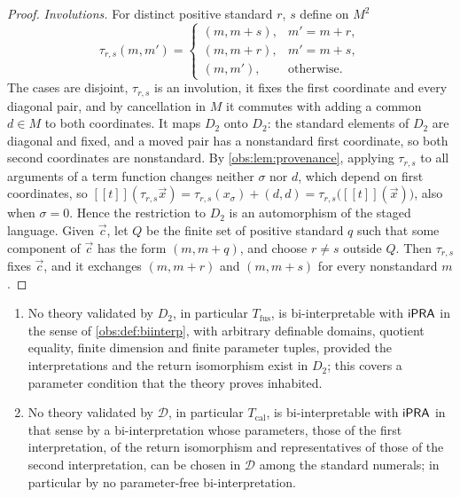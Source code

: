\begin{proof}
\emph{Involutions.} For distinct positive standard $r$, $s$ define on $M^{2}$
\[
\tau_{r,s}(m,m')=
\begin{cases}
(m,m+s), & m'=m+r,\\
(m,m+r), & m'=m+s,\\
(m,m'), & \text{otherwise}.
\end{cases}
\]
The cases are disjoint, $\tau_{r,s}$ is an involution, it fixes the first
coordinate and every diagonal pair, and by cancellation in $M$ it commutes with
adding a common $d\in M$ to both coordinates. It maps $D_2$ onto $D_2$: the
standard elements of $D_2$ are diagonal and fixed, and a moved pair has a
nonstandard first coordinate, so both second coordinates are nonstandard. By
\cref{obs:lem:provenance}, applying $\tau_{r,s}$ to all arguments of a term
function changes neither $\sigma$ nor $d$, which depend on first coordinates,
so
$[\![t]\!](\tau_{r,s}\vec x)=\tau_{r,s}(x_\sigma)+(d,d)=\tau_{r,s}\bigl([\![t]\!](\vec x)\bigr)$,
also when $\sigma=0$. Hence the restriction to $D_2$ is an automorphism of the
staged language. Given $\vec c$, let $Q$ be the finite set of positive standard
$q$ such that some component of $\vec c$ has the form $(m,m+q)$, and choose
$r\ne s$ outside $Q$. Then $\tau_{r,s}$ fixes $\vec c$, and it exchanges
$(m,m+r)$ and $(m,m+s)$ for every nonstandard $m$.
\end{proof}

\begin{corollary}
\label{obs:cor:barrier-biinterp}
\begin{enumerate}[label=(\roman*)]
\item No theory validated by $D_2$, in particular $T_{\mathrm{fus}}$, is
bi-interpretable with $\mathsf{iPRA}$ in the sense of \cref{obs:def:biinterp}, with
arbitrary definable domains, quotient equality, finite dimension and finite
parameter tuples, provided the interpretations and the return isomorphism exist
in $D_2$; this covers a parameter condition that the theory proves inhabited.
\item No theory validated by $\mathcal{D}$, in particular $T_{\mathrm{cal}}$,
is bi-interpretable with $\mathsf{iPRA}$ in that sense by a bi-interpretation whose
parameters, those of the first interpretation, of the return isomorphism and
representatives of those of the second interpretation, can be chosen in
$\mathcal{D}$ among the standard numerals; in particular by no
parameter-free bi-interpretation.
\end{enumerate}
\end{corollary}

